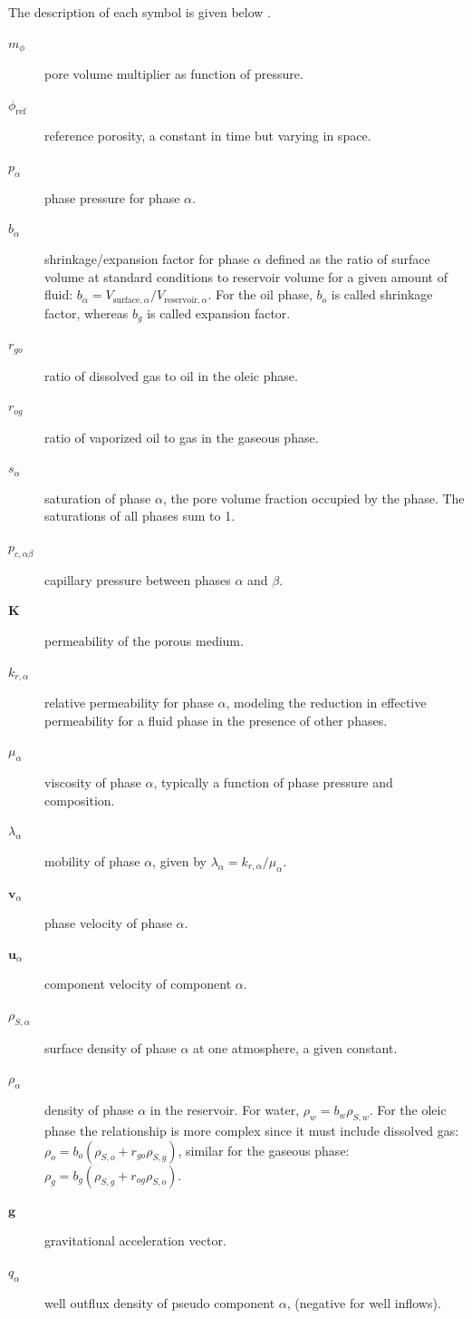 The description of each symbol is given below 
\cite[adapted]{Rasmussen:2021}.

\begin{description}
    \item[$m_\phi$] pore volume multiplier as function of pressure.
    \item[$\phi_{\text{ref}}$] reference porosity, a constant in time
    but varying in space.
    \item[$p_\alpha$] phase pressure for phase $\alpha$.
    \item[$b_\alpha$] shrinkage/expansion factor for phase $\alpha$ defined as the ratio of surface volume at standard conditions to reservoir volume for a given amount of fluid:
        $b_\alpha = V_{\text{surface}, \alpha}/V_{\text{reservoir}, \alpha}$.
        For the oil phase, $b_o$ is called shrinkage factor, 
        whereas $b_g$ is called expansion factor.
    \item[$r_{go}$] ratio of dissolved gas to oil in the oleic phase.
    \item[$r_{og}$] ratio of vaporized oil to gas in the gaseous phase.
    \item[$s_\alpha$] saturation of phase $\alpha$, the pore volume fraction occupied by the phase. The saturations of all phases sum to 1.
    \item[$p_{c,\alpha \beta}$] capillary pressure between phases $\alpha$ and $\beta$.
    \item[$\mathbf{K}$] permeability of the porous medium.
    \item[$k_{r,\alpha}$] relative permeability for phase $\alpha$, modeling the reduction in effective permeability for a fluid phase in the presence of other phases.
    \item[$\mu_\alpha$] viscosity of phase $\alpha$, typically a function of phase pressure and composition.
    \item[$\lambda_\alpha$] mobility of phase $\alpha$, given by $\lambda_\alpha = k_{r,\alpha}/\mu_\alpha$.
    \item[$\mathbf{v}_\alpha$] phase velocity of phase $\alpha$.
    \item[$\mathbf{u}_\alpha$] component velocity of component $\alpha$.
    \item[$\rho_{S, \alpha}$] surface density of phase $\alpha$ at one atmosphere, a given constant.
    \item[$\rho_\alpha$] density of phase $\alpha$ in the reservoir. 
        For water, $\rho_w = b_w\rho_{S,w}$. 
        For the oleic phase the relationship is more complex since it must include dissolved gas: 
            $\rho_o = b_o(\rho_{S,o} + r_{go}\rho_{S,g})$, 
        similar for the gaseous phase: 
            $\rho_g = b_g(\rho_{S,g} + r_{og}\rho_{S,o})$.
    \item[$\mathbf{g}$] gravitational acceleration vector.
    \item[$q_\alpha$] well outflux density of pseudo component $\alpha$, (negative for well inflows).
\end{description}

